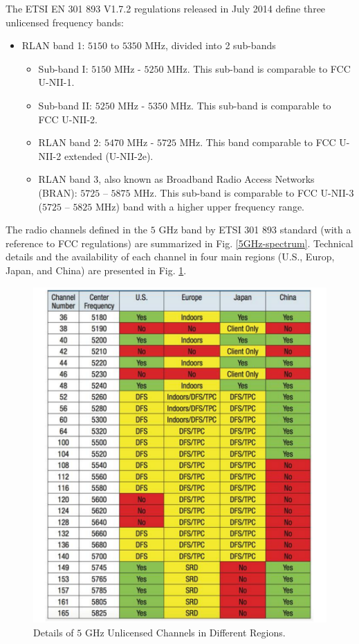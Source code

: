 The ETSI EN 301 893 V1.7.2 regulations \cite{LBT-ETSI-2014} released in July 2014 define three unlicensed frequency bands:
\begin{itemize}
\item
	RLAN band 1: $5150$ to $5350$ MHz, divided into 2 sub-bands
	\begin{itemize}
	\item
		Sub-band I: $5150$ MHz - $5250$ MHz. This sub-band is comparable to FCC U-NII-1. 
	\item
		Sub-band II: $5250$ MHz - $5350$ MHz. This sub-band is comparable to FCC U-NII-2.
	\item
		RLAN band 2: $5470$ MHz - $5725$ MHz. This band comparable to FCC U-NII-2 extended (U-NII-2e).
	\item
		RLAN band 3, also known as Broadband Radio Access Networks (BRAN): $5725$ – $5875$ MHz. This sub-band is comparable to FCC U-NII-3 ($5725$ – $5825$ MHz) band with a higher upper frequency range.
	\end{itemize}
\end{itemize}

The radio channels defined in the $5$ GHz band by ETSI 301 893 standard (with a reference to FCC regulations) are summarized in Fig. \ref{5GHz-spectrum}.  Technical details and the availability of each channel in four main regions (U.S., Europ, Japan, and China) are presented in Fig. \ref{figs:5GHz-spectrum-table}.
\begin{figure}[!ht]
	\centering
	\includegraphics[width=0.85\columnwidth]{figs/5GHz-spectrum-table.pdf}
	\caption{Details of $5$ GHz Unlicensed Channels in Different Regions.}
	\label{figs:5GHz-spectrum-table}
\end{figure}


